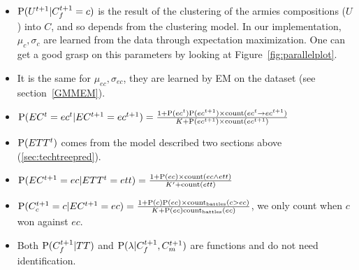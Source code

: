 \begin{itemize}
    \item $\mathrm{P}(U^{t+1}|C_f^{t+1}=c)$ is the result of the clustering of the armies compositions ($U$) into $C$, and so depends from the clustering model. 
In our implementation, $\mu_{c},\sigma_{c}$ are learned from the data through expectation maximization. One can get a good grasp on this parameters by looking at Figure~\ref{fig:parallelplot}.

    \item It is the same for $\mu_{ec},\sigma_{ec}$, they are learned by EM on the dataset (see section~\ref{GMMEM}).

    \item $\mathrm{P}(EC^t=ec^t|EC^{t+1}=ec^{t+1}) = \frac{1+ \mathrm{P}(ec^t)\mathrm{P}(ec^{t+1}) \times \mathrm{count}(ec^t \rightarrow ec^{t+1})}{K+\mathrm{P}(ec^{t+1})\times \mathrm{count}(ec^{t+1})}$

    \item $\mathrm{P}(ETT^t)$ comes from the model described two sections above (\ref{sec:techtreepred}).

    \item $\mathrm{P}(EC^{t+1}=ec|ETT^t=ett) = \frac{1 + \mathrm{P}(ec) \times \mathrm{count}(ec \wedge ett)}{K' + \mathrm{count}(ett)}$

    \item $\mathrm{P}(C_c^{t+1}=c | EC^{t+1}=ec) = \frac{1 + \mathrm{P}(c)\mathrm{P}(ec) \times \mathrm{count_{battles}}(c > ec)}{K + \mathrm{P}(ec)\mathrm{count_{battles}}(ec)}$, we only count when $c$ won against $ec$.
    
    \item Both $\mathrm{P}(C_f^{t+1}|TT)$ and $\mathrm{P}(\lambda | C_f^{t+1},C_m^{t+1})$ are functions and do not need identification.


\end{itemize}


